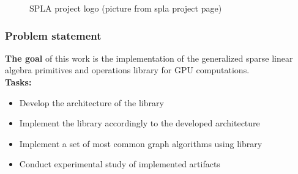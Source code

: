 \documentclass[aspectratio=169,xcolor=table,english]{beamer}
\begin{document}
\begin{frame}[fragile]
\begin{minipage}[m]{0.3\linewidth}
\begin{figure}
            \caption{SPLA project logo (picture from spla project page)}
            \label{fig:logo}
        \end{figure}
    \end{minipage}\hfill
\end{frame}

\begin{frame}[fragile] \frametitle{Problem statement}
    \textbf{The goal} of this work is the implementation of the generalized sparse linear algebra primitives and operations library for GPU computations.\\
    \textbf{Tasks:}
    \begin{itemize}
        \item Develop the architecture of the library
        \item Implement the library accordingly to the developed architecture 
        \item Implement a set of most common graph algorithms using library
        \item Conduct experimental study of implemented artifacts
    \end{itemize}
\end{frame}
\end{document}
